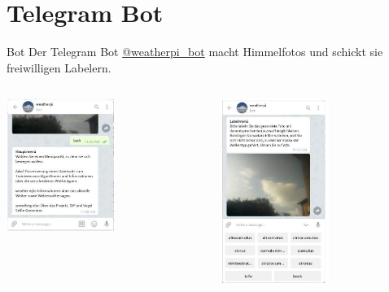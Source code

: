 \section{Telegram Bot}%
\begin{frame}[t]{Bot}
  Der Telegram Bot
    \href{https://telegram.me/weatherpi_bot}{\alert{@weatherpi\_bot}}
    macht Himmelfotos und schickt sie freiwilligen Labelern.
  \begin{columns}
    \begin{column}[t]{0.5\textwidth}
      \centering
      \includegraphics[width=100pt]{content/mainmenu.jpg}
    \end{column}
    \begin{column}[t]{0.5\textwidth}
      \centering
      \includegraphics[width=100pt]{content/labelmenu.jpg}
    \end{column}
  \end{columns}
\end{frame}
